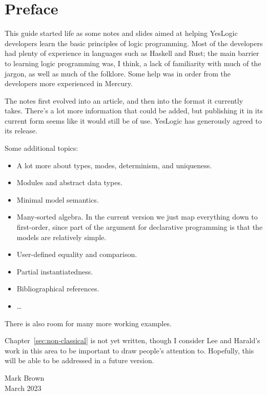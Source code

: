 \chapter{Preface}

This guide
started life as some notes and slides
aimed at helping YesLogic developers
learn the basic principles of logic programming.
Most of the developers had plenty of experience
in languages such as Haskell and Rust;
the main barrier to learning logic programming was, I think,
a lack of familiarity with much of the jargon,
as well as much of the folklore.
Some help was in order from the developers more experienced in Mercury.

The notes first evolved into an article,
and then into the format it currently takes.
There's a lot more information that could be added,
but publishing it in its current form seems like it would still be of use.
YesLogic has generously agreed to its release.

Some additional topics:
\begin{itemize}
\item
A lot more about types, modes, determinism, and uniqueness.
\item
Modules and abstract data types.
\item
Minimal model semantics.
\item
Many-sorted algebra.
In the current version we just map everything down to first-order,
since part of the argument for declarative programming
is that the models are relatively simple.
\item
User-defined equality and comparison.
\item
Partial instantiatedness.
\item
Bibliographical references.
\item
\ldots
\end{itemize}
There is also room for many more working examples.

Chapter~\ref{sec:non-classical} is not yet written,
though I consider Lee and Harald's work in this area
to be important to draw people's attention to.
Hopefully, this will be able to be addressed in a future version.

\bigskip
\noindent
Mark Brown \\
March 2023
